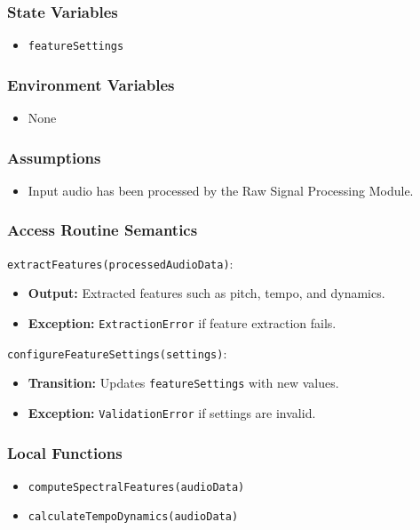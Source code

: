 \documentclass[12pt, titlepage]{article}
\begin{document}
\subsubsection{State Variables}  
\begin{itemize}  
    \item \texttt{featureSettings}  
\end{itemize}  

\subsubsection{Environment Variables}  
\begin{itemize}  
    \item None  
\end{itemize}  

\subsubsection{Assumptions}  
\begin{itemize}  
    \item Input audio has been processed by the Raw Signal Processing Module.  
\end{itemize}  

\subsubsection{Access Routine Semantics}  

\noindent \texttt{extractFeatures(processedAudioData)}:
\begin{itemize}  
    \item \textbf{Output:} Extracted features such as pitch, tempo, and dynamics.  
    \item \textbf{Exception:} \texttt{ExtractionError} if feature extraction fails.  
\end{itemize}  

\noindent \texttt{configureFeatureSettings(settings)}:
\begin{itemize}  
    \item \textbf{Transition:} Updates \texttt{featureSettings} with new values.  
    \item \textbf{Exception:} \texttt{ValidationError} if settings are invalid.  
\end{itemize}  

\subsubsection{Local Functions}  
\begin{itemize}  
    \item \texttt{computeSpectralFeatures(audioData)}  
    \item \texttt{calculateTempoDynamics(audioData)}  
\end{itemize}  
\end{document}
